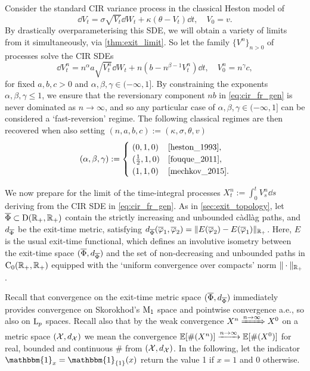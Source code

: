 Consider the standard CIR variance process in the classical Heston model of \cite{heston_1993}
\begin{equation}
    \dd V_t = \sigma\sqrt{V_t}\dd W_t + \kappa(\theta - V_t)\dd t,\quad V_0=v.
\end{equation}
By drastically overparameterising this SDE, we will obtain a variety of limits from it simultaneously, via \autoref{thm:exit_limit}. So let the family $\{V^n\}_{n>0}$ of processes solve the CIR SDEs~
\begin{equation}\label{eq:cir_fr_gen}
    \dd V^n_t = n^\alpha a \sqrt{V^n_t}\dd W_t + n(b - n^{\beta-1} V^n_t)\dd t,\quad V^n_0=n^\gamma c,
\end{equation}
for fixed $a,b,c > 0$ and $\alpha,\beta,\gamma\in(-\infty,1]$. By constraining the exponents $\alpha,\beta,\gamma\le1$, we ensure that the reversionary component $nb$ in \autoref{eq:cir_fr_gen} is never dominated as $n\to\infty$, and so any particular case of $\alpha,\beta,\gamma\in(-\infty,1]$ can be considered a `fast-reversion' regime. The following classical regimes are then recovered when also setting $(n,a,b,c) := (\kappa,\sigma,\theta,v)$
\begin{equation}\label{eq:diff_regimes}
    (\alpha,\beta,\gamma) :=
    \begin{cases}
        \ (0,1,0)         &\text{\cite{heston_1993}}, \\
        \ (\frac12,1,0)   &\text{\cite{fouque_2011}}, \\
        \ (1,1,0)         &\text{\cite{mechkov_2015}}.
    \end{cases}
\end{equation}

We now prepare for the limit of the time-integral processes $X^n_t:=\int_0^t V^n_s\dd s$ deriving from the CIR SDE in \autoref{eq:cir_fr_gen}. As in \autoref{sec:exit_topology}, let $\overline{\Phi}\subset\mathrm{D}(\mathbb{R}_+,\mathbb{R}_+)$ contain the strictly increasing and unbounded c\`adl\`ag paths, and $d_{\overline{\Phi}}$ be the exit-time metric, satisfying $d_{\overline{\Phi}}(\overline{\varphi}_1,\overline{\varphi}_2) = \Vert E(\overline{\varphi}_2) - E(\overline{\varphi}_1)\Vert_{\mathbb{R}_+}$. Here, $E$ is the usual exit-time functional, which defines an involutive isometry between the exit-time space $(\overline{\Phi},d_{\overline{\Phi}})$ and the set of non-decreasing and unbounded paths in $\mathrm{C}_0(\mathbb{R}_+,\mathbb{R}_+)$ equipped with the `uniform convergence over compacts' norm $\Vert\cdot\Vert_{\mathbb{R}_+}$.

Recall that convergence on the exit-time metric space $(\overline{\Phi},d_{\overline{\Phi}})$ immediately provides convergence on Skorokhod's $\mathrm{M}_1$ space and pointwise convergence a.e., so also on $\mathrm{L}_p$ spaces. Recall also that by the weak convergence $X^n\xRightarrow{n\to\infty} X^0$ on a metric space $(\mathcal{X},d_{\mathcal{X}})$ we mean the convergence $\mathbb{E}[\#(X^n)]\xrightarrow{n\to\infty}\mathbb{E}[\#(X^0)]$ for real, bounded and continuous $\#$ from $(\mathcal{X},d_{\mathcal{X}})$. In the following, let the indicator $\mathbbm{1}_x=\mathbbm{1}_{\{1\}}(x)$ return the value 1 if $x=1$ and 0 otherwise.

